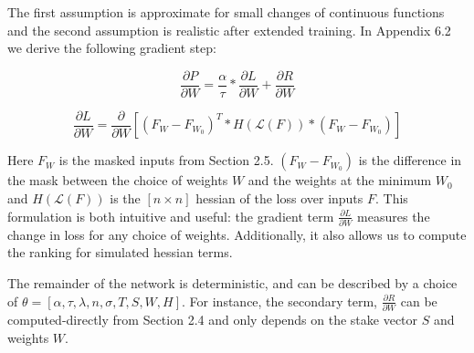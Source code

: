 \documentclass{article}
\begin{document}
The first assumption is approximate for small changes of continuous functions and the second assumption is realistic after extended training. In Appendix 6.2 we derive the following gradient step:
\smallskip

\begin{equation}
\frac{\partial P}{\partial W} = \frac{\alpha}{\tau} * \frac{\partial L}{\partial W} + \frac{\partial R}{\partial W}
\end{equation}
\smallskip


\begin{equation}
\frac{\partial L}{\partial W} = \frac{\partial}{\partial W} [(F_W - F_{W_0})^T * H( \mathcal{L}(F)) * (F_W - F_{W_0})] 
\end{equation}
\smallskip

Here $F_W$ is the masked inputs from Section 2.5. $(F_W - F_{W_0})$ is the difference in the mask between the choice of weights $W$ and the weights at the minimum $W_0$ and $H( \mathcal{L}(F))$ is the $[n \times n]$ hessian of the loss over inputs $F$. This formulation is both intuitive and useful: the gradient term $\frac{\partial L}{\partial W}$ measures the change in loss for any choice of weights. Additionally, it also allows us to compute the ranking for simulated hessian terms.
\smallskip

The remainder of the network is deterministic, and can be described by a choice of $\theta = [\alpha, \tau, \lambda, n, \sigma, T, S, W, H]$. For instance, the secondary term, $\frac{\partial R}{\partial W}$ can be computed-directly from Section 2.4 and only depends on the stake vector $S$ and weights $W$.
\smallskip
\end{document}
